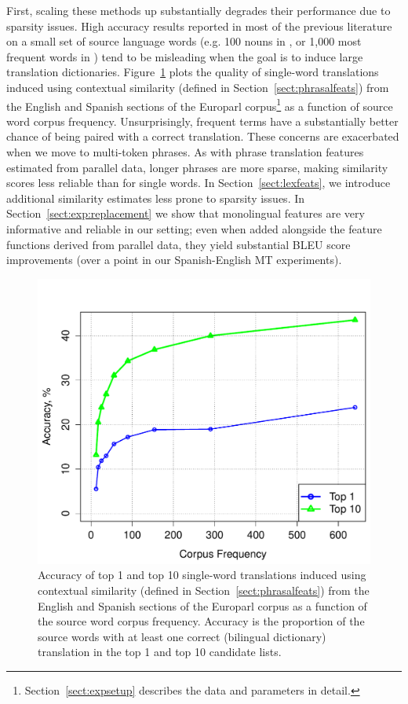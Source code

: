 \documentclass[11pt]{article}
\newcommand{\secref}[1]{Section~\ref{#1}}
\newcommand{\figref}[1]{Figure~\ref{#1}}
\begin{document}
First, scaling these methods up substantially degrades their performance due to sparsity issues. High accuracy results reported in most of the previous literature on a small set of source language words (e.g. 100 nouns in , or 1,000 most frequent words in \cite{Koehn:2002}) tend to be misleading when the goal is to induce large translation dictionaries. \figref{fig:lexinduct} plots the quality of single-word translations induced using contextual similarity (defined in \secref{sect:phrasalfeats}) from the English and Spanish sections of the Europarl corpus\footnote{\secref{sect:expsetup} describes the data and parameters in detail.} as a function of source word corpus frequency. Unsurprisingly, frequent terms have a substantially better chance of being paired with a correct translation.  These concerns are exacerbated when we move to multi-token phrases.  As with phrase translation features estimated from parallel data, longer phrases are more sparse, making similarity scores less reliable than for single words.  In \secref{sect:lexfeats}, we introduce additional similarity estimates less prone to sparsity issues.  In \secref{sect:exp:replacement} we show that monolingual features are very informative and reliable in our setting; even when added alongside the feature functions derived from parallel data, they yield substantial BLEU score improvements (over a point in our Spanish-English MT experiments). %

\begin{figure}[t]
\begin{center}
\includegraphics[width=\linewidth]{../figures/lexinductnew/lexinductnew.pdf}
\caption{Accuracy of top 1 and top 10 single-word translations induced using contextual similarity (defined in \secref{sect:phrasalfeats}) from the English and Spanish sections of the Europarl corpus as a function of the source word corpus frequency.  Accuracy is the proportion of the source words with at least one correct (bilingual dictionary) translation in the top 1 and top 10 candidate lists.}
\label{fig:lexinduct}
\end{center}
\vskip -0.2in
\end{figure}
\end{document}
